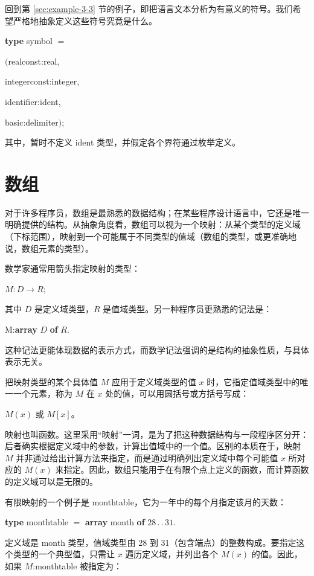 \documentclass[twoside,11pt,fontset=none]{ctexbook}
\begin{document}
回到第 \ref{sec:example-3-3} 节的例子，即把语言文本分析为有意义的符号。我们希望严格地抽象定义这些符号究竟是什么。

\quad \textbf{type} symbol $=$

\tabto*{5.6em}$($realconst:real,

\tabto*{6em}integerconst:integer,

\tabto*{6em}identifier:ident,

\tabto*{6em}basic:delimiter$)$;

\noindent
其中，暂时不定义 ident 类型，并假定各个界符通过枚举定义。
\section[数组]{数组}
\label{sec:array}

对于许多程序员，数组是最熟悉的数据结构；在某些程序设计语言中，它还是唯一明确提供的结构。从抽象角度看，数组可以视为一个映射：从某个类型的定义域（下标范围），映射到一个可能属于不同类型的值域（数组的类型，或更准确地说，数组元素的类型）。

数学家通常用箭头指定映射的类型：

\quad $M:D\rightarrow R$;

\noindent
其中 $D$ 是定义域类型，$R$ 是值域类型。另一种程序员更熟悉的记法是：

\quad M:\textbf{array} $D$ \textbf{of} $R$.

\noindent
这种记法更能体现数据的表示方式，而数学记法强调的是结构的抽象性质，与具体表示无关。

把映射类型的某个具体值 $M$ 应用于定义域类型的值 $x$ 时，它指定值域类型中的唯一一个元素，称为 $M$ 在 $x$ 处的值，可以用圆括号或方括号写成：

\quad $M(x)$ 或 $M[x]$。

\noindent
映射也叫函数。这里采用“映射”一词，是为了把这种数据结构与一段程序区分开：后者确实根据定义域中的参数，计算出值域中的一个值。区别的本质在于，映射 $M$ 并非通过给出计算方法来指定，而是通过明确列出定义域中每个可能值 $x$ 所对应的 $M(x)$ 来指定。因此，数组只能用于在有限个点上定义的函数，而计算函数的定义域可以是无限的。

有限映射的一个例子是 monthtable，它为一年中的每个月指定该月的天数：

\quad \textbf{type} monthtable $=$ \textbf{array} month \textbf{of} $28\,.\,.\,31$.

\noindent
定义域是 month 类型，值域类型由 28 到 31（包含端点）的整数构成。要指定这个类型的一个典型值，只需让 $x$ 遍历定义域，并列出各个 $M(x)$ 的值。因此，如果 $M$:monthtable 被指定为：
\end{document}
